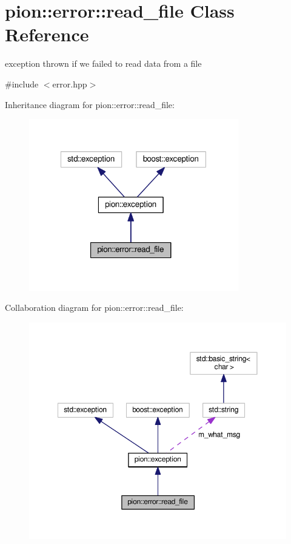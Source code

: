 \hypertarget{classpion_1_1error_1_1read__file}{\section{pion\-:\-:error\-:\-:read\-\_\-file Class Reference}
\label{classpion_1_1error_1_1read__file}
}


exception thrown if we failed to read data from a file  




{\ttfamily \#include $<$error.\-hpp$>$}



Inheritance diagram for pion\-:\-:error\-:\-:read\-\_\-file\-:
\nopagebreak
\begin{figure}[H]
\begin{center}
\leavevmode
\includegraphics[width=259pt]{classpion_1_1error_1_1read__file__inherit__graph}
\end{center}
\end{figure}


Collaboration diagram for pion\-:\-:error\-:\-:read\-\_\-file\-:
\nopagebreak
\begin{figure}[H]
\begin{center}
\leavevmode
\includegraphics[width=350pt]{classpion_1_1error_1_1read__file__coll__graph}
\end{center}
\end{figure}
